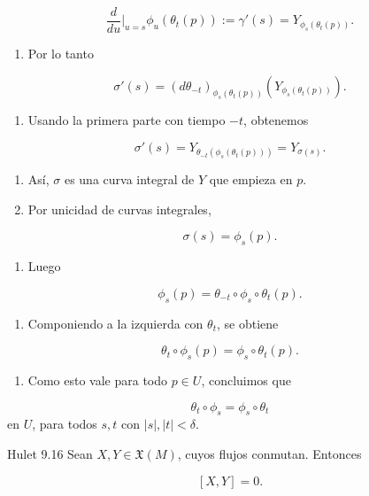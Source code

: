 \begin{bookproof}{}
\[
\frac{d}{du}\bigg|_{u=s}\phi_u(\theta_t(p)):=\gamma'(s)=Y_{\phi_s(\theta_t(p))}.
\]
\begin{enumerate}[start=7]
\item Por lo tanto
\end{enumerate}
\[
\sigma'(s)=(d\theta_{-t})_{\phi_s(\theta_t(p))}\left(Y_{\phi_s(\theta_t(p))}\right).
\]
\begin{enumerate}[start=8]
\item Usando la primera parte con tiempo $-t$, obtenemos
\end{enumerate}
\[
\sigma'(s)=Y_{\theta_{-t}(\phi_s(\theta_t(p)))}=Y_{\sigma(s)}.
\]
\begin{enumerate}[start=9]
\item Así, $\sigma$ es una curva integral de $Y$ que empieza en $p$.
\item Por unicidad de curvas integrales,
\end{enumerate}
\[
\sigma(s)=\phi_s(p).
\]
\begin{enumerate}[start=11]
\item Luego
\end{enumerate}
\[
\phi_s(p)=\theta_{-t}\circ\phi_s\circ\theta_t(p).
\]
\begin{enumerate}[start=12]
\item Componiendo a la izquierda con $\theta_t$, se obtiene
\end{enumerate}
\[
\theta_t\circ\phi_s(p)=\phi_s\circ\theta_t(p).
\]
\begin{enumerate}[start=13]
\item Como esto vale para todo $p\in U$, concluimos que
\end{enumerate}
\[
\theta_t\circ\phi_s=\phi_s\circ\theta_t
\]
en $U$, para todos $s,t$ con $|s|,|t|<\delta$.

\bookqed
\end{bookproof}
\begin{bookproposition}{Hulet 9.16}
Sean $X,Y\in\mathfrak{X}(M)$, cuyos flujos conmutan. Entonces

\[
[X,Y]=0.
\]
\end{bookproposition}
